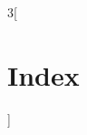 \makeatletter
\renewenvironment{theindex}
 {\pagestyle{plain}\parindent\z@
  \parskip\z@ \@plus .3\p@\relax
  \let\item\@idxitem}
 {\thispagestyle{plain}}
\makeatother
\begin{multicols}{3}[\chapter*{Index}]
  \printindex
\end{multicols}

